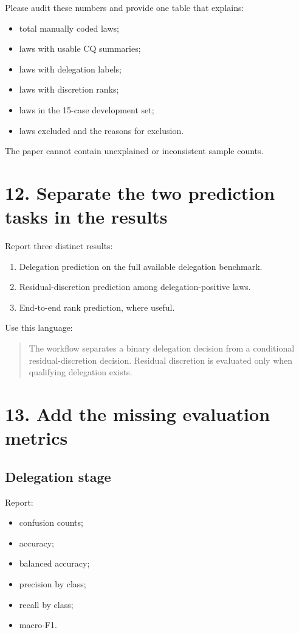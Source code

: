 \documentclass[11pt]{article}
\begin{document}
Please audit these numbers and provide one table that explains:

\begin{itemize}
    \item total manually coded laws;
    \item laws with usable CQ summaries;
    \item laws with delegation labels;
    \item laws with discretion ranks;
    \item laws in the 15-case development set;
    \item laws excluded and the reasons for exclusion.
\end{itemize}

The paper cannot contain unexplained or inconsistent sample counts.

\section*{12. Separate the two prediction tasks in the results}

Report three distinct results:

\begin{enumerate}
    \item Delegation prediction on the full available delegation benchmark.
    \item Residual-discretion prediction among delegation-positive laws.
    \item End-to-end rank prediction, where useful.
\end{enumerate}

Use this language:

\begin{quote}
The workflow separates a binary delegation decision from a conditional residual-discretion decision. Residual discretion is evaluated only when qualifying delegation exists.
\end{quote}

\section*{13. Add the missing evaluation metrics}

\subsection*{Delegation stage}

Report:

\begin{itemize}
    \item confusion counts;
    \item accuracy;
    \item balanced accuracy;
    \item precision by class;
    \item recall by class;
    \item macro-F1.
\end{itemize}
\end{document}
